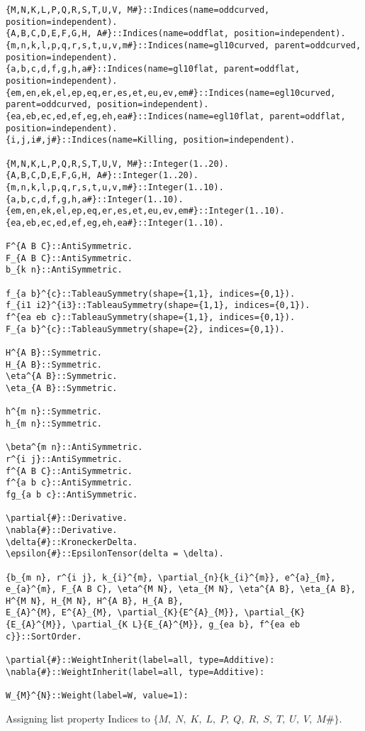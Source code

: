\documentclass[11pt]{article}
\begin{document}
{\color[named]{Blue}\begin{verbatim}
{M,N,K,L,P,Q,R,S,T,U,V, M#}::Indices(name=oddcurved, position=independent).
{A,B,C,D,E,F,G,H, A#}::Indices(name=oddflat, position=independent).
{m,n,k,l,p,q,r,s,t,u,v,m#}::Indices(name=gl10curved, parent=oddcurved, position=independent).
{a,b,c,d,f,g,h,a#}::Indices(name=gl10flat, parent=oddflat, position=independent).
{em,en,ek,el,ep,eq,er,es,et,eu,ev,em#}::Indices(name=egl10curved, parent=oddcurved, position=independent).
{ea,eb,ec,ed,ef,eg,eh,ea#}::Indices(name=egl10flat, parent=oddflat, position=independent).
{i,j,i#,j#}::Indices(name=Killing, position=independent).

{M,N,K,L,P,Q,R,S,T,U,V, M#}::Integer(1..20).
{A,B,C,D,E,F,G,H, A#}::Integer(1..20).
{m,n,k,l,p,q,r,s,t,u,v,m#}::Integer(1..10).
{a,b,c,d,f,g,h,a#}::Integer(1..10).
{em,en,ek,el,ep,eq,er,es,et,eu,ev,em#}::Integer(1..10).
{ea,eb,ec,ed,ef,eg,eh,ea#}::Integer(1..10).

F^{A B C}::AntiSymmetric.
F_{A B C}::AntiSymmetric.
b_{k n}::AntiSymmetric.

f_{a b}^{c}::TableauSymmetry(shape={1,1}, indices={0,1}).
f_{i1 i2}^{i3}::TableauSymmetry(shape={1,1}, indices={0,1}).
f^{ea eb c}::TableauSymmetry(shape={1,1}, indices={0,1}).
F_{a b}^{c}::TableauSymmetry(shape={2}, indices={0,1}).

H^{A B}::Symmetric.
H_{A B}::Symmetric.
\eta^{A B}::Symmetric.
\eta_{A B}::Symmetric.

h^{m n}::Symmetric.
h_{m n}::Symmetric.

\beta^{m n}::AntiSymmetric.
r^{i j}::AntiSymmetric.
f^{A B C}::AntiSymmetric.
f^{a b c}::AntiSymmetric.
fg_{a b c}::AntiSymmetric.

\partial{#}::Derivative.
\nabla{#}::Derivative.
\delta{#}::KroneckerDelta.
\epsilon{#}::EpsilonTensor(delta = \delta).

{b_{m n}, r^{i j}, k_{i}^{m}, \partial_{n}{k_{i}^{m}}, e^{a}_{m}, e_{a}^{m}, F_{A B C}, \eta^{M N}, \eta_{M N}, \eta^{A B}, \eta_{A B}, H^{M N}, H_{M N}, H^{A B}, H_{A B},
E_{A}^{M}, E^{A}_{M}, \partial_{K}{E^{A}_{M}}, \partial_{K}{E_{A}^{M}}, \partial_{K L}{E_{A}^{M}}, g_{ea b}, f^{ea eb c}}::SortOrder.

\partial{#}::WeightInherit(label=all, type=Additive):
\nabla{#}::WeightInherit(label=all, type=Additive):

W_{M}^{N}::Weight(label=W, value=1):
\end{verbatim}}
Assigning list property Indices to $\{M,\; N,\; K,\; L,\; P,\; Q,\; R,\; S,\; T,\; U,\; V,\; M\#\}$.
\end{document}
